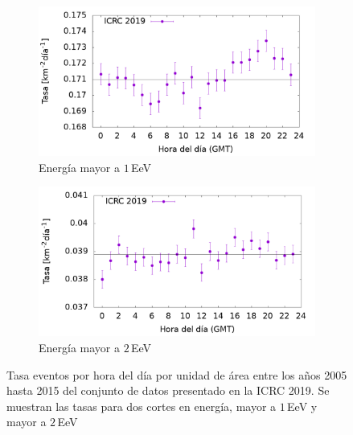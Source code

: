 			\begin{figure}[H]
    			\begin{subfigure}[b]{0.495\textwidth}
				\includegraphics[width=\textwidth]{Graphs/rate_hour_of_the_day/1EeV_ICRC_2019_05_19.png}
				\caption{Energía mayor a $1\,$EeV}
				\label{fig:rate_day_ICRC_19_05_18_2EeV}
    			\end{subfigure}%
    			\hspace{\fill}
    			\centering
    			\begin{subfigure}[b]{0.495\textwidth}
				\includegraphics[width=\textwidth]{Graphs/rate_hour_of_the_day/2EeV_ICRC_2019_05_18.png}
				\caption{Energía mayor a $2\,$EeV}
				\label{fig:rate_2015_ICRC_19_05_18_2EeV}
    			\end{subfigure}%
    			\caption{Tasa eventos  por hora del día por unidad de área entre los años 2005 hasta 2015 del conjunto de datos presentado en la ICRC 2019.  Se muestran las tasas para dos cortes en energía, mayor a $1\,$EeV y mayor a $2\,$EeV}\label{fig:rate_new_18_2EeV}
			\end{figure}


	
